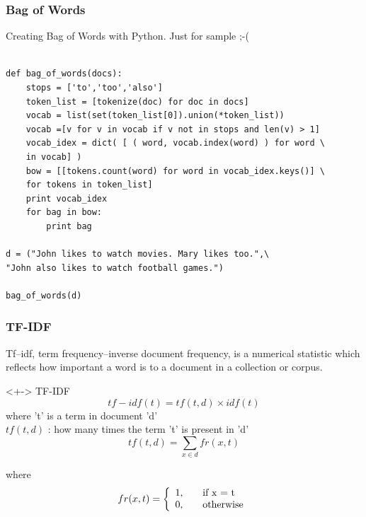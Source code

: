 \documentclass[serif,11pt,aspectratio=1610,table]{beamer}
\begin{document}
\begin{frame}[fragile]
 \frametitle{Bag of Words}
Creating Bag of Words with Python. Just for sample ;-(
\footnotesize
\begin{verbatim}

def bag_of_words(docs):
    stops = ['to','too','also']
    token_list = [tokenize(doc) for doc in docs]
    vocab = list(set(token_list[0]).union(*token_list))
    vocab =[v for v in vocab if v not in stops and len(v) > 1]
    vocab_idex = dict( [ ( word, vocab.index(word) ) for word \
    in vocab] )
    bow = [[tokens.count(word) for word in vocab_idex.keys()] \
    for tokens in token_list]
    print vocab_idex
    for bag in bow:
        print bag

d = ("John likes to watch movies. Mary likes too.",\
"John also likes to watch football games.")

bag_of_words(d)
\end{verbatim}

\end{frame}


\begin{frame}[fragile]
 \frametitle{TF-IDF}
Tf–idf, term frequency–inverse document frequency, is a numerical statistic which reflects how important a word is to a document in a collection or corpus. 
\begin{block}<+-> {TF-IDF}
\begin{displaymath}
 tf-idf(t) = tf(t,d) \times idf(t)
\end{displaymath}
where 't' is a term in document 'd' \\
$tf(t,d)$ : how many times the term 't' is present in 'd'
 \begin{displaymath}
  tf(t,d) = \sum_{ x \in d} fr(x,t)
 \end{displaymath}

where
\begin{displaymath}
 fr(x,t) = \left\{
  \begin{array}{l l} 
   1, & \quad \text{if x = t} \\
   0, & \quad \text{otherwise} \\
  \end{array} \right.
\end{displaymath}

\end{block}

\end{frame}
\end{document}

